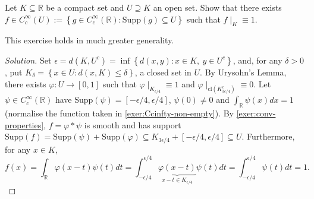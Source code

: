 \documentclass[12pt, draft,reqno,a4paper, twoside]{amsproc}
\newcommand{\supp}{\mathrm{Supp}}
\newcommand{\cl}[1]{\mathrm{cl}\left(#1\right)}
\newcommand{\dbR}{\mathbb R}
\newcommand{\set}[1]{\left\{{#1}\right\}}
\begin{document}
\begin{exer}\label{exer:smooth-urysohn} Let $K\subseteq\dbR$ be a compact set and $U\supseteq K$ an open set. Show that there exists $f\in C_c^\infty (U):=\set{g\in C_c^\infty(\dbR):\supp (g)\subseteq U}$ such that $f\mid_{K}\equiv 1$. 
\end{exer}
\begin{rem}This exercise holds in much greater generality.%
\end{rem}
\begin{proof}[\it Solution]
Set $\epsilon=d(K,U^c)=\inf\set{d(x,y):x\in K,\:y\in U^c}$, and, for any $\delta>0$, put $K_\delta=\set{x\in U:d(x,K)\le \delta}$, a closed set in $U$. By Urysohn's Lemma, there exists $\varphi:U\to [0,1]$ such that $\varphi\mid_{K_{\epsilon/4}}\equiv 1$ and $\varphi\mid_{\cl{K_{3\epsilon/4}^c}}\equiv 0$. Let $\psi\in C_c^\infty(\dbR)$ have $\supp(\psi)=[-\epsilon/4,\epsilon/4]$, $\psi(0)\ne 0$ and $\int_{\dbR}\psi(x)dx=1$ (normalise the function taken in \autoref{exer:Ccinfty-non-empty}). By \autoref{exer:conv-properties}, $f=\varphi\ast\psi$ is smooth and has support $\supp(f)=\supp(\psi)+\supp(\varphi)\subseteq K_{3\epsilon/4}+[-\epsilon/4,\epsilon/4]\subseteq U$. Furthermore, for any $x\in K$,
\[f(x)=\int_{\dbR}\varphi(x-t)\psi(t)dt=\int_{-\epsilon/4}^{\epsilon/4}\underbrace{\varphi(x-t)}_{x-t\in K_{\epsilon/4}}\psi(t)dt=\int_{-\epsilon/4}^{\epsilon/4}\psi(t)dt=1.\]
\end{proof}
\end{document}
